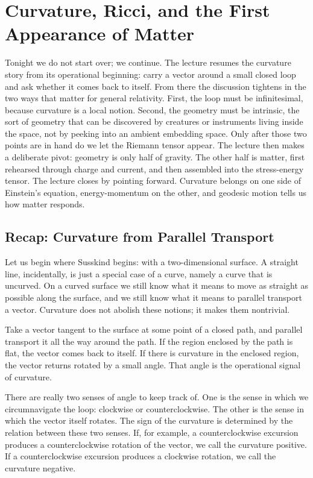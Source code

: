 \chapter{Curvature, Ricci, and the First Appearance of Matter}

Tonight we do not start over; we continue. The lecture resumes the curvature story from its operational beginning: carry a vector around a small closed loop and ask whether it comes back to itself. From there the discussion tightens in the two ways that matter for general relativity. First, the loop must be infinitesimal, because curvature is a local notion. Second, the geometry must be intrinsic, the sort of geometry that can be discovered by creatures or instruments living inside the space, not by peeking into an ambient embedding space. Only after those two points are in hand do we let the Riemann tensor appear. The lecture then makes a deliberate pivot: geometry is only half of gravity. The other half is matter, first rehearsed through charge and current, and then assembled into the stress-energy tensor. The lecture closes by pointing forward. Curvature belongs on one side of Einstein's equation, energy-momentum on the other, and geodesic motion tells us how matter responds.

\section{Recap: Curvature from Parallel Transport}

Let us begin where Susskind begins: with a two-dimensional surface. A straight line, incidentally, is just a special case of a curve, namely a curve that is uncurved. On a curved surface we still know what it means to move as straight as possible along the surface, and we still know what it means to parallel transport a vector. Curvature does not abolish these notions; it makes them nontrivial.

Take a vector tangent to the surface at some point of a closed path, and parallel transport it all the way around the path. If the region enclosed by the path is flat, the vector comes back to itself. If there is curvature in the enclosed region, the vector returns rotated by a small angle. That angle is the operational signal of curvature.

There are really two senses of angle to keep track of. One is the sense in which we circumnavigate the loop: clockwise or counterclockwise. The other is the sense in which the vector itself rotates. The sign of the curvature is determined by the relation between these two senses. If, for example, a counterclockwise excursion produces a counterclockwise rotation of the vector, we call the curvature positive. If a counterclockwise excursion produces a clockwise rotation, we call the curvature negative.

